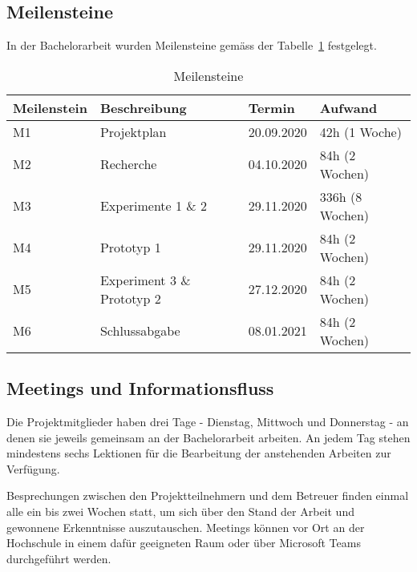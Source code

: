 \subsection*{Meilensteine}
In der Bachelorarbeit wurden Meilensteine gemäss der 
Tabelle~\ref{table:Meilensteine} festgelegt.
\begin{table}[H]
	\centering
	\begin{tabularx}{\linewidth}{l X l l}
		\toprule 
		\textbf{Meilenstein} & \textbf{Beschreibung} & \textbf{Termin} & \textbf{Aufwand} \\
		\midrule
		M1 & Projektplan & 20.09.2020 & 42h (1 Woche) \\
		M2 & Recherche & 04.10.2020 & 84h (2 Wochen) \\
		M3 & Experimente 1 \& 2 & 29.11.2020 & 336h (8 Wochen) \\
		M4 & Prototyp 1 & 29.11.2020 & 84h (2 Wochen) \\
		M5 & Experiment 3 \& Prototyp 2 & 27.12.2020 & 84h (2 Wochen) \\
		M6 & Schlussabgabe & 08.01.2021 & 84h (2 Wochen) \\
		\bottomrule 
	\end{tabularx} 
	\caption{Meilensteine
	\label{table:Meilensteine}} 
\end{table}

\subsection*{Meetings und Informationsfluss}
Die Projektmitglieder haben drei Tage - Dienstag, Mittwoch und Donnerstag -
an denen sie jeweils gemeinsam an der Bachelorarbeit arbeiten. 
An jedem Tag stehen mindestens sechs Lektionen für die Bearbeitung der 
anstehenden Arbeiten zur Verfügung.

Besprechungen zwischen den Projektteilnehmern und dem Betreuer finden
einmal alle ein bis zwei Wochen statt, um sich über den Stand der Arbeit
und gewonnene Erkenntnisse auszutauschen. 
Meetings können vor Ort an der Hochschule in einem dafür geeigneten Raum 
oder über Microsoft Teams durchgeführt werden.


\clearpage

